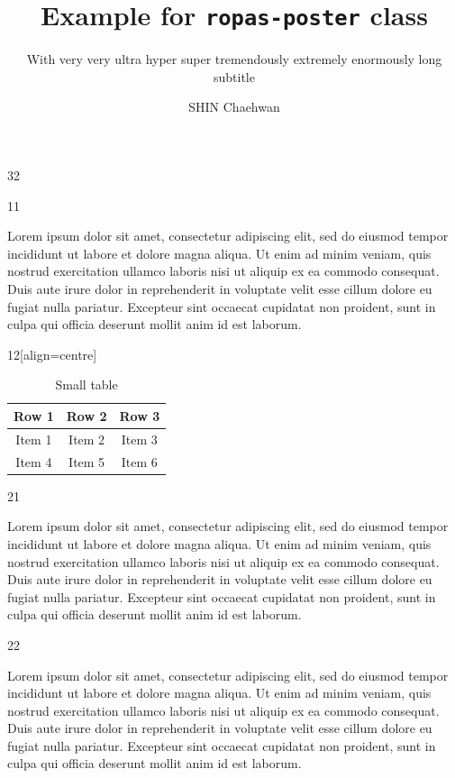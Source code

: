 \documentclass{ropas-poster}
\title{Example for \texttt{ropas-poster} class}
\subtitle{With very very ultra hyper super tremendously extremely enormously long subtitle}
\author{SHIN Chaehwan}
\institute{Programming Research Laboratory (ROPAS), Seoul National University}
\begin{document}
  \begin{postergrid}{3}{2}
    \begin{posterblock}{1}{1}

      Lorem ipsum dolor sit amet, consectetur adipiscing elit, sed do eiusmod tempor incididunt ut labore et dolore magna aliqua.
      Ut enim ad minim veniam, quis nostrud exercitation ullamco laboris nisi ut aliquip ex ea commodo consequat.
      Duis aute irure dolor in reprehenderit in voluptate velit esse cillum dolore eu fugiat nulla pariatur.
      Excepteur sint occaecat cupidatat non proident, sunt in culpa qui officia deserunt mollit anim id est laborum.
    \end{posterblock}

    \begin{posterblock}{1}{2}[align=centre]

      \begin{table}
        \caption{Small table}
        \begin{tabular}{ccc}
          \toprule
          Row 1 & Row 2 & Row 3 \\
          \midrule
          Item 1 & Item 2 & Item 3 \\
          Item 4 & Item 5 & Item 6 \\
          \bottomrule
        \end{tabular}
      \end{table}
    \end{posterblock}

    \begin{posterblock}{2}{1}

      Lorem ipsum dolor sit amet, consectetur adipiscing elit, sed do eiusmod tempor incididunt ut labore et dolore magna aliqua.
      Ut enim ad minim veniam, quis nostrud exercitation ullamco laboris nisi ut aliquip ex ea commodo consequat.
      Duis aute irure dolor in reprehenderit in voluptate velit esse cillum dolore eu fugiat nulla pariatur.
      Excepteur sint occaecat cupidatat non proident, sunt in culpa qui officia deserunt mollit anim id est laborum.
    \end{posterblock}

    \begin{posterblock}{2}{2}

      Lorem ipsum dolor sit amet, consectetur adipiscing elit, sed do eiusmod tempor incididunt ut labore et dolore magna aliqua.
      Ut enim ad minim veniam, quis nostrud exercitation ullamco laboris nisi ut aliquip ex ea commodo consequat.
      Duis aute irure dolor in reprehenderit in voluptate velit esse cillum dolore eu fugiat nulla pariatur.
      Excepteur sint occaecat cupidatat non proident, sunt in culpa qui officia deserunt mollit anim id est laborum.
    \end{posterblock}


\end{postergrid}
\end{document}
